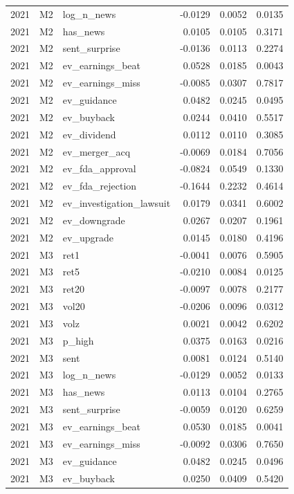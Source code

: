 \begin{tabular}{rllrrr}
2021 & M2 & log\_n\_news & -0.0129 & 0.0052 & 0.0135 \\
2021 & M2 & has\_news & 0.0105 & 0.0105 & 0.3171 \\
2021 & M2 & sent\_surprise & -0.0136 & 0.0113 & 0.2274 \\
2021 & M2 & ev\_earnings\_beat & 0.0528 & 0.0185 & 0.0043 \\
2021 & M2 & ev\_earnings\_miss & -0.0085 & 0.0307 & 0.7817 \\
2021 & M2 & ev\_guidance & 0.0482 & 0.0245 & 0.0495 \\
2021 & M2 & ev\_buyback & 0.0244 & 0.0410 & 0.5517 \\
2021 & M2 & ev\_dividend & 0.0112 & 0.0110 & 0.3085 \\
2021 & M2 & ev\_merger\_acq & -0.0069 & 0.0184 & 0.7056 \\
2021 & M2 & ev\_fda\_approval & -0.0824 & 0.0549 & 0.1330 \\
2021 & M2 & ev\_fda\_rejection & -0.1644 & 0.2232 & 0.4614 \\
2021 & M2 & ev\_investigation\_lawsuit & 0.0179 & 0.0341 & 0.6002 \\
2021 & M2 & ev\_downgrade & 0.0267 & 0.0207 & 0.1961 \\
2021 & M2 & ev\_upgrade & 0.0145 & 0.0180 & 0.4196 \\
2021 & M3 & ret1 & -0.0041 & 0.0076 & 0.5905 \\
2021 & M3 & ret5 & -0.0210 & 0.0084 & 0.0125 \\
2021 & M3 & ret20 & -0.0097 & 0.0078 & 0.2177 \\
2021 & M3 & vol20 & -0.0206 & 0.0096 & 0.0312 \\
2021 & M3 & volz & 0.0021 & 0.0042 & 0.6202 \\
2021 & M3 & p\_high & 0.0375 & 0.0163 & 0.0216 \\
2021 & M3 & sent & 0.0081 & 0.0124 & 0.5140 \\
2021 & M3 & log\_n\_news & -0.0129 & 0.0052 & 0.0133 \\
2021 & M3 & has\_news & 0.0113 & 0.0104 & 0.2765 \\
2021 & M3 & sent\_surprise & -0.0059 & 0.0120 & 0.6259 \\
2021 & M3 & ev\_earnings\_beat & 0.0530 & 0.0185 & 0.0041 \\
2021 & M3 & ev\_earnings\_miss & -0.0092 & 0.0306 & 0.7650 \\
2021 & M3 & ev\_guidance & 0.0482 & 0.0245 & 0.0496 \\
2021 & M3 & ev\_buyback & 0.0250 & 0.0409 & 0.5420 \\

\end{tabular}
